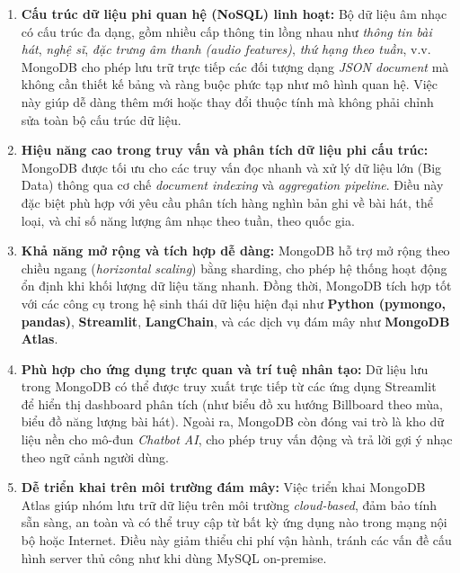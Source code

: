 \documentclass{../hcmut-report}
\begin{document}
\begin{enumerate}
    \item \textbf{Cấu trúc dữ liệu phi quan hệ (NoSQL) linh hoạt:}  
    Bộ dữ liệu âm nhạc có cấu trúc đa dạng, gồm nhiều cấp thông tin lồng nhau như \textit{thông tin bài hát}, \textit{nghệ sĩ}, \textit{đặc trưng âm thanh (audio features)}, \textit{thứ hạng theo tuần}, v.v.  
    MongoDB cho phép lưu trữ trực tiếp các đối tượng dạng \textit{JSON document} mà không cần thiết kế bảng và ràng buộc phức tạp như mô hình quan hệ.  
    Việc này giúp dễ dàng thêm mới hoặc thay đổi thuộc tính mà không phải chỉnh sửa toàn bộ cấu trúc dữ liệu.

    \item \textbf{Hiệu năng cao trong truy vấn và phân tích dữ liệu phi cấu trúc:}  
    MongoDB được tối ưu cho các truy vấn đọc nhanh và xử lý dữ liệu lớn (Big Data) thông qua cơ chế \textit{document indexing} và \textit{aggregation pipeline}.  
    Điều này đặc biệt phù hợp với yêu cầu phân tích hàng nghìn bản ghi về bài hát, thể loại, và chỉ số năng lượng âm nhạc theo tuần, theo quốc gia.

    \item \textbf{Khả năng mở rộng và tích hợp dễ dàng:}  
    MongoDB hỗ trợ mở rộng theo chiều ngang (\textit{horizontal scaling}) bằng sharding, cho phép hệ thống hoạt động ổn định khi khối lượng dữ liệu tăng nhanh.  
    Đồng thời, MongoDB tích hợp tốt với các công cụ trong hệ sinh thái dữ liệu hiện đại như \textbf{Python (pymongo, pandas)}, \textbf{Streamlit}, \textbf{LangChain}, và các dịch vụ đám mây như \textbf{MongoDB Atlas}.

    \item \textbf{Phù hợp cho ứng dụng trực quan và trí tuệ nhân tạo:}  
    Dữ liệu lưu trong MongoDB có thể được truy xuất trực tiếp từ các ứng dụng Streamlit để hiển thị dashboard phân tích (như biểu đồ xu hướng Billboard theo mùa, biểu đồ năng lượng bài hát).  
    Ngoài ra, MongoDB còn đóng vai trò là kho dữ liệu nền cho mô-đun \textit{Chatbot AI}, cho phép truy vấn động và trả lời gợi ý nhạc theo ngữ cảnh người dùng.

    \item \textbf{Dễ triển khai trên môi trường đám mây:}  
    Việc triển khai MongoDB Atlas giúp nhóm lưu trữ dữ liệu trên môi trường \textit{cloud-based}, đảm bảo tính sẵn sàng, an toàn và có thể truy cập từ bất kỳ ứng dụng nào trong mạng nội bộ hoặc Internet.  
    Điều này giảm thiểu chi phí vận hành, tránh các vấn đề cấu hình server thủ công như khi dùng MySQL on-premise.
\end{enumerate}
\end{document}
